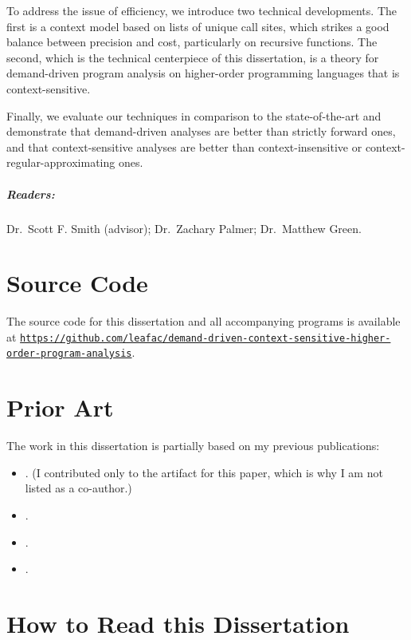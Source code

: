 \documentclass[12pt, oneside]{book}
\begin{document}
To address the issue of efficiency, we introduce two technical developments. The first is a context model based on lists of unique call sites, which strikes a good balance between precision and cost, particularly on recursive functions. The second, which is the technical centerpiece of this dissertation, is a theory for demand-driven program analysis on higher-order programming languages that is context-sensitive.

Finally, we evaluate our techniques in comparison to the state-of-the-art and demonstrate that demand-driven analyses are better than strictly forward ones, and that context-sensitive analyses are better than context-insensitive or context-regular-approximating ones.

\paragraph{Readers:}

Dr.~Scott F. Smith (advisor); Dr.~Zachary Palmer; Dr.~Matthew Green.

\chapter{Source Code}

The source code for this dissertation and all accompanying programs is available at \href{https://github.com/leafac/demand-driven-context-sensitive-higher-order-program-analysis}{\texttt{https://github.com/leafac/demand-driven-context-sensitive-higher-order-program-analysis}}.

\chapter{Prior Art}

The work in this dissertation is partially based on my previous publications:

\begin{itemize}
  \item {}. (I contributed only to the artifact for this paper, which is why I am not listed as a co-author.)
  \item {}.
  \item {}.
  \item {}.
\end{itemize}

\chapter{How to Read this Dissertation}
\end{document}
